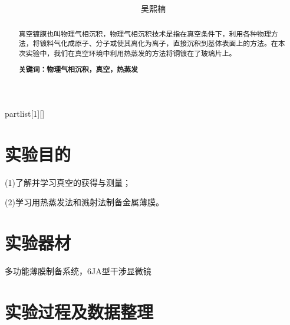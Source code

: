 \documentclass[UTF8]{ctexart}
\author{
	吴熙楠}
\title{
	\heiti{真空镀膜实验报告}
}
\begin{document}
	\maketitle
	\newtheorem{definition}{定义}[subsection]
	\newtheorem{function}{公式}[subsection]
	\newtheorem{summary}{小结}[subsection]
	\newtheorem{deduction}{推论}[subsection]
	\newtheorem{property}{性质}[subsection]
	\newtheorem{theo}{定理}[subsection]
	\newtheorem{step}{步骤}[subsection]
	\newtheorem{remark}{注记}[subsection]
	\newtheorem{proof}{证明}[subsection]
	\newenvironment{Theorem}[1][]{\par\noindent\textbf{定理}(#1)\quad}{\par}
	\newcommand{\rbra}[1]{\left( #1 \right)}
	\newcommand{\sbra}[1]{\left[ #1 \right]}
	\newcommand{\cbra}[1]{\left\{ #1 \right\}}
	\newcommand{\pbra}[1]{\left< #1 \right>}
	\newcommand{\abs}[1]{\left| #1 \right|}
	\newcommand{\fs}[2]{\displaystyle\frac{#1}{#2}}
	
	\newenvironment{myproof}{{\color{blue}证：}}
	
	\newenvironment{partlist}[1][]
	{\begin{enumerate}[itemsep=0pt, label=(\arabic*), wide, labelindent=\parindent, listparindent=\parindent, #1]}
		{\end{enumerate}}
	
	\renewcommand{\contentsname}{目录} %
	\tableofcontents
	\newpage
	\renewcommand{\abstractname}{\large 摘要\\}
	\begin{abstract}
		真空镀膜也叫物理气相沉积，物理气相沉积技术是指在真空条件下，利用各种物理方法，将镀料气化成原子、分子或使其离化为离子，直接沉积到基体表面上的方法。在本次实验中，我们在真空环境中利用热蒸发的方法将铜镀在了玻璃片上。
		
		\textbf{关键词：物理气相沉积，真空，热蒸发}
	\end{abstract}
	\section{实验目的}
	(1)了解并学习真空的获得与测量；
	\par(2)学习用热蒸发法和溅射法制备金属薄膜。
	\section{实验器材}
	多功能薄膜制备系统，6JA型干涉显微镜
	\section{实验过程及数据整理}
\end{document}
